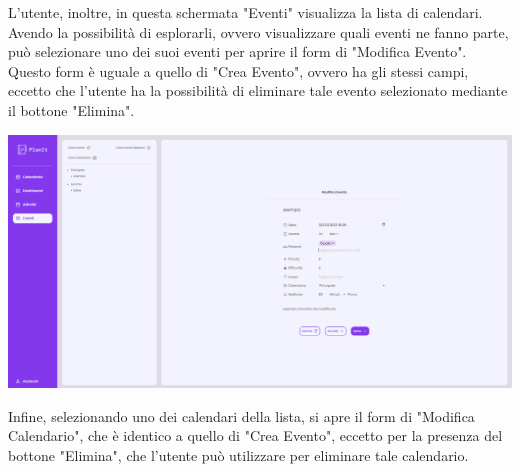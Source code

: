 L'utente, inoltre, in questa schermata "Eventi" visualizza la lista di calendari. Avendo la possibilità di esplorarli, ovvero visualizzare quali eventi ne fanno parte, può selezionare uno dei suoi eventi per aprire il form di "Modifica Evento". Questo form è uguale a quello di "Crea Evento", ovvero ha gli stessi campi, eccetto che l'utente ha la possibilità di eliminare tale evento selezionato mediante il bottone "Elimina".

\begin{center}
    \includegraphics[width=1\textwidth, height=0.3\textheight]{img/png/FrontEnd/Eventi/EventiModificaEvento.png}
\end{center}


Infine, selezionando uno dei calendari della lista, si apre il form di "Modifica Calendario", che è identico a quello di "Crea Evento", eccetto per la presenza del bottone "Elimina", che l'utente può utilizzare per eliminare tale calendario.

